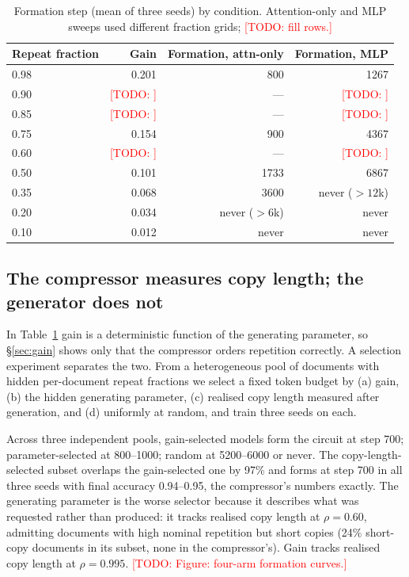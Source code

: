 \documentclass[11pt]{article}
\newcommand{\todo}[1]{\textcolor{red}{[TODO: #1]}}
\begin{document}
\begin{table}[t]\centering\small
\begin{tabular}{lrrr}\toprule
Repeat fraction & Gain & Formation, attn-only & Formation, MLP \\\midrule
0.98 & 0.201 & 800   & 1267 \\
0.90 & \todo{} & --- & \todo{} \\
0.85 & \todo{} & --- & \todo{} \\
0.75 & 0.154 & 900   & 4367 \\
0.60 & \todo{} & --- & \todo{} \\
0.50 & 0.101 & 1733  & 6867 \\
0.35 & 0.068 & 3600  & never ($>12$k) \\
0.20 & 0.034 & never ($>6$k) & never \\
0.10 & 0.012 & never & never \\\bottomrule
\end{tabular}
\caption{Formation step (mean of three seeds) by condition. Attention-only
and MLP sweeps used different fraction grids; \todo{fill rows.}}
\label{tab:gain}
\end{table}

\subsection{The compressor measures copy length; the generator does not}
\label{sec:oracle}

In Table~\ref{tab:gain} gain is a deterministic function of the generating
parameter, so \S\ref{sec:gain} shows only that the compressor orders
repetition correctly. A selection experiment separates the two. From a
heterogeneous pool of documents with hidden per-document repeat fractions
we select a fixed token budget by (a) gain, (b) the hidden generating
parameter, (c) realised copy length measured after generation, and (d)
uniformly at random, and train three seeds on each.

Across three independent pools, gain-selected models form the circuit at
step 700; parameter-selected at 800--1000; random at 5200--6000 or never.
The copy-length-selected subset overlaps the gain-selected one by 97\% and
forms at step 700 in all three seeds with final accuracy 0.94--0.95, the
compressor's numbers exactly. The generating parameter is the worse
selector because it describes what was requested rather than produced: it
tracks realised copy length at $\rho=0.60$, admitting documents with high
nominal repetition but short copies (24\% short-copy documents in its
subset, none in the compressor's). Gain tracks realised copy length at
$\rho=0.995$. \todo{Figure: four-arm formation curves.}
\end{document}
